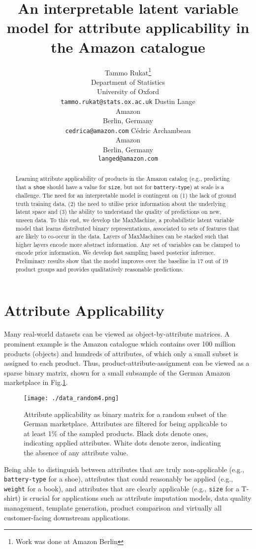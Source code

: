 \documentclass{article}
\title{An interpretable latent variable model for attribute applicability in the Amazon catalogue}
\author{
  Tammo Rukat\thanks{Work was done at Amazon Berlin}\\
  Department of Statistics\\ University of Oxford\\
  \texttt{tammo.rukat@stats.ox.ac.uk}
  \And
  Dustin Lange\\
  Amazon\\ Berlin, Germany\\
  \texttt{cedrica@amazon.com}  
  \And
  C\'edric Archambeau\\
  Amazon\\ Berlin, Germany\\
  \texttt{langed@amazon.com}  
}
\begin{document}

\maketitle

\begin{abstract}
  Learning attribute applicability of products in the Amazon catalog (e.g., predicting that a \texttt{shoe}
  should have a value for \texttt{size}, but not for
  \texttt{battery-type}) at scale is a challenge. The need for an interpretable model is contingent on (1) the lack of ground truth training data, (2) the need to utilise prior information about the underlying latent space and (3) the ability to understand the quality of predictions on new, unseen data.
  To this end, we develop the MaxMachine, a probabilistic latent
  variable model that learns distributed binary representations,
  associated to sets of features that are likely to co-occur in the
  data. Layers of MaxMachines can be stacked such that higher layers
  encode more abstract information. Any set of variables can be
  clamped to encode prior information. We develop fast sampling based posterior inference.
  Preliminary results show that the model improves over the baseline in 17 out of 19 product groups and provides qualitatively reasonable predictions.
\end{abstract}


\section{Attribute Applicability}
\label{sec:org75c4eff}
Many real-world datasets can be viewed as object-by-attribute matrices. A prominent example is the Amazon catalogue which contains over 100 million products (objects) and hundreds of attributes, of which only a small subset is assigned to each product. Thus, product-attribute-assignment can be viewed as a sparse binary matrix, shown for a small subsample of the German Amazon marketplace in Fig.\space{}\ref{fig:data}.
\begin{figure}[h]
  \centering
\texttt{[image: ./data\_random4.png]}
\caption{
  Attribute applicability as binary matrix for a random subset of the German marketplace. Attributes are filtered for being applicable to at least 1\% of the sampled products. Black dots denote ones, indicating applied attributes. White dots denote zeros, indicating the absence of any attribute value.
  \label{fig:data}}
\end{figure}
Being able to distinguish between attributes that are truly
non-applicable (e.g., \texttt{battery-type} for a shoe), attributes that 
could reasonably be applied (e.g., \texttt{weight} for a book), and
attributes that are clearly applicable (e.g., \texttt{size} for a T-shirt) is
crucial for applications such as attribute imputation models, data
quality management, template generation, product comparison and
virtually all customer-facing downstream applications.
\end{document}
